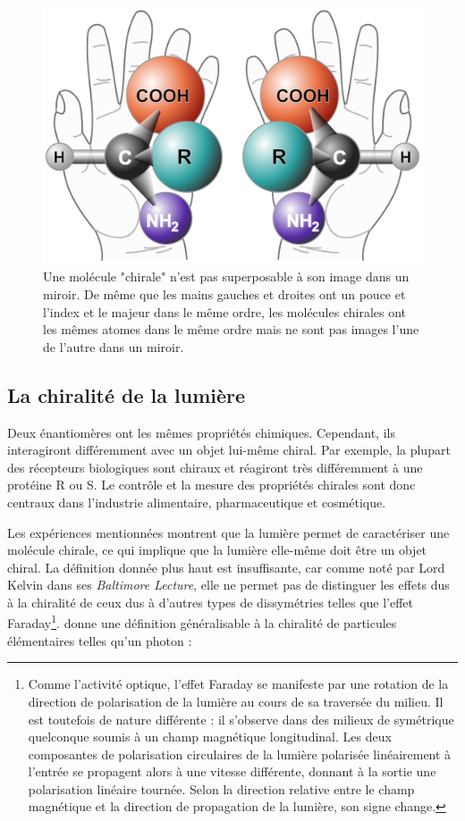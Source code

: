 \begin{figure}[!ht]
\centering
\includegraphics[width=.5\columnwidth]{Figures/Chirality/chirality_with_hands.pdf}%
\caption{Une molécule "chirale" n'est pas superposable à son image dans un miroir. De même que les mains gauches et droites ont un pouce et l'index et le majeur dans le même ordre, les molécules chirales ont les mêmes atomes dans le même ordre mais ne sont pas images l'une de l'autre dans un miroir.}
\label{fig:chirality}
\end{figure}

\subsection{La chiralité de la lumière}
Deux énantiomères ont les mêmes propriétés chimiques. Cependant, ils interagiront différemment avec un objet lui-même chiral. Par exemple, la plupart des récepteurs biologiques sont chiraux et réagiront très différemment à une protéine R ou S. Le contrôle et la mesure des propriétés chirales sont donc centraux dans l'industrie alimentaire, pharmaceutique et cosmétique. 

Les expériences mentionnées montrent que la lumière permet de caractériser une molécule chirale, ce qui implique que la lumière elle-même doit être un objet chiral. La définition donnée plus haut est insuffisante, car comme noté par Lord Kelvin dans ses \textit{Baltimore Lecture}, elle ne permet pas de distinguer les effets dus à la chiralité de ceux dus à d'autres types de dissymétries telles que l'effet Faraday\label{page:noteFaraday}\footnote{Comme l'activité optique, l'effet Faraday se manifeste par une rotation de la direction de polarisation de la lumière au cours de sa traversée du milieu. Il est toutefois de nature différente : il s'observe dans des milieux de symétrique quelconque soumis à un champ magnétique longitudinal. Les deux composantes de polarisation circulaires de la lumière polarisée linéairement à l'entrée se propagent alors à une vitesse différente, donnant à la sortie une polarisation linéaire tournée. Selon la direction relative entre le champ magnétique et la direction de propagation de la lumière, son signe change.}.  donne une définition généralisable à la chiralité de particules élémentaires telles qu'un photon :

